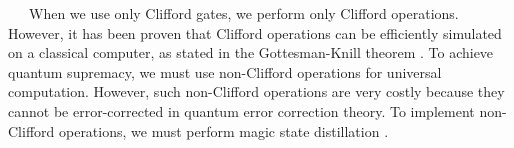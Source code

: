 \documentclass[a4paper,11pt]{ltjsarticle}
\begin{document}
{{        \clearpage

        \ \ \ When we use only Clifford gates, we perform only Clifford operations. However, it has been proven that Clifford operations can be efficiently simulated on a classical computer, as stated in the Gottesman-Knill theorem \cite{gottesman1998}. To achieve quantum supremacy, we must use non-Clifford operations for universal computation. However, such non-Clifford operations are very costly because they cannot be error-corrected in quantum error correction theory. To implement non-Clifford operations, we must perform magic state distillation \cite{litinski2019}.
    }
}
\end{document}

